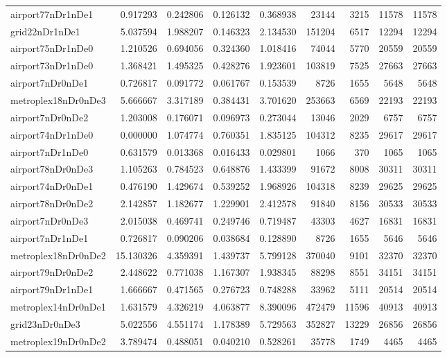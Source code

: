 \begin{longtable}{|l|r|r|r|r|r|r|r|r|}
airport77nDr1nDe1 & 0.917293 & 0.242806 & 0.126132 & 0.368938 & 23144 & 3215 & 11578 & 11578 \\
grid22nDr1nDe1 & 5.037594 & 1.988207 & 0.146323 & 2.134530 & 151204 & 6517 & 12294 & 12294 \\
airport75nDr1nDe0 & 1.210526 & 0.694056 & 0.324360 & 1.018416 & 74044 & 5770 & 20559 & 20559 \\
airport73nDr1nDe0 & 1.368421 & 1.495325 & 0.428276 & 1.923601 & 103819 & 7525 & 27663 & 27663 \\
airport7nDr0nDe1 & 0.726817 & 0.091772 & 0.061767 & 0.153539 & 8726 & 1655 & 5648 & 5648 \\
metroplex18nDr0nDe3 & 5.666667 & 3.317189 & 0.384431 & 3.701620 & 253663 & 6569 & 22193 & 22193 \\
airport7nDr0nDe2 & 1.203008 & 0.176071 & 0.096973 & 0.273044 & 13046 & 2029 & 6757 & 6757 \\
airport74nDr1nDe0 & 0.000000 & 1.074774 & 0.760351 & 1.835125 & 104312 & 8235 & 29617 & 29617 \\
airport7nDr1nDe0 & 0.631579 & 0.013368 & 0.016433 & 0.029801 & 1066 & 370 & 1065 & 1065 \\
airport78nDr0nDe3 & 1.105263 & 0.784523 & 0.648876 & 1.433399 & 91672 & 8008 & 30311 & 30311 \\
airport74nDr0nDe1 & 0.476190 & 1.429674 & 0.539252 & 1.968926 & 104318 & 8239 & 29625 & 29625 \\
airport78nDr0nDe2 & 2.142857 & 1.182677 & 1.229901 & 2.412578 & 91840 & 8156 & 30533 & 30533 \\
airport7nDr0nDe3 & 2.015038 & 0.469741 & 0.249746 & 0.719487 & 43303 & 4627 & 16831 & 16831 \\
airport7nDr1nDe1 & 0.726817 & 0.090206 & 0.038684 & 0.128890 & 8726 & 1655 & 5646 & 5646 \\
metroplex18nDr0nDe2 & 15.130326 & 4.359391 & 1.439737 & 5.799128 & 370040 & 9101 & 32370 & 32370 \\
airport79nDr0nDe2 & 2.448622 & 0.771038 & 1.167307 & 1.938345 & 88298 & 8551 & 34151 & 34151 \\
airport79nDr1nDe1 & 1.666667 & 0.471565 & 0.276723 & 0.748288 & 33962 & 5111 & 20514 & 20514 \\
metroplex14nDr0nDe1 & 1.631579 & 4.326219 & 4.063877 & 8.390096 & 472479 & 11596 & 40913 & 40913 \\
grid23nDr0nDe3 & 5.022556 & 4.551174 & 1.178389 & 5.729563 & 352827 & 13229 & 26856 & 26856 \\
metroplex19nDr0nDe2 & 3.789474 & 0.488051 & 0.040210 & 0.528261 & 35778 & 1749 & 4465 & 4465 \\

\end{longtable}
